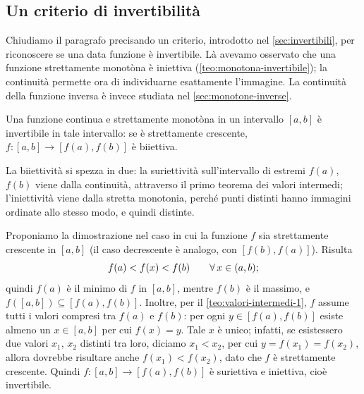\subsection{Un criterio di invertibilità}

Chiudiamo il paragrafo precisando un criterio, introdotto nel \cref{sec:invertibili},
per riconoscere se una data funzione è invertibile. Là avevamo osservato che una
funzione strettamente monotòna è iniettiva (\cref{teo:monotona-invertibile}); la
continuità permette ora di individuarne esattamente l'immagine. La continuità della
funzione inversa è invece studiata nel \cref{sec:monotone-inverse}.

\begin{teorema}\label{teo:invertibilita}
Una funzione continua e strettamente monotòna in un intervallo $[a,b]$ è invertibile in
tale intervallo: se è strettamente crescente, $f:[a,b]\to[f(a),f(b)]$ è biiettiva.
\end{teorema}

\begin{schema}
\end{schema}

\begin{strategia}
La biiettività si spezza in due: la suriettività sull'intervallo di estremi $f(a)$,
$f(b)$ viene dalla continuità, attraverso il primo teorema dei valori intermedi;
l'iniettività viene dalla stretta monotonia, perché punti distinti hanno immagini
ordinate allo stesso modo, e quindi distinte.
\end{strategia}

\begin{dimostrazione}
Proponiamo la dimostrazione nel caso in cui la funzione $f$ sia strettamente crescente
in $[a,b]$ (il caso decrescente è analogo, con $[f(b),f(a)]$). Risulta
\begin{equation}\label{eq:invertibilita-estremi}
  f(a)<f(x)<f(b) \qquad\forall\, x\in(a,b);
\end{equation}
quindi $f(a)$ è il minimo di $f$ in $[a,b]$, mentre $f(b)$ è il massimo, e
$f([a,b])\subseteq[f(a),f(b)]$. Inoltre, per il \cref{teo:valori-intermedi-1}, $f$
assume tutti i valori compresi tra $f(a)$ e $f(b)$: per ogni $y\in[f(a),f(b)]$ esiste
almeno un $x\in[a,b]$ per cui $f(x)=y$. Tale $x$ è unico; infatti, se esistessero due
valori $x_{1}$, $x_{2}$ distinti tra loro, diciamo $x_{1}<x_{2}$, per cui
$y=f(x_{1})=f(x_{2})$, allora dovrebbe risultare anche $f(x_{1})<f(x_{2})$, dato che $f$ è
strettamente crescente. Quindi $f:[a,b]\to[f(a),f(b)]$ è suriettiva e iniettiva, cioè
invertibile.
\end{dimostrazione}
